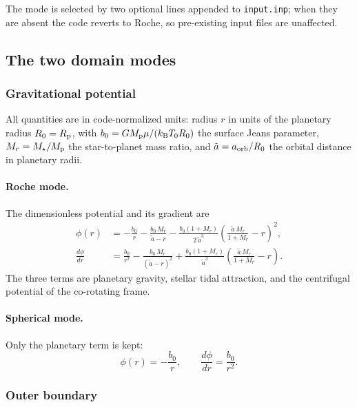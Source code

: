 \documentclass[english,a4paper]{kiseon_memo}
\begin{document}
The mode is selected by two optional lines appended to \texttt{input.inp}; when
they are absent the code reverts to Roche, so pre-existing input files are
unaffected.

\subsection{The two domain modes}

\subsubsection{Gravitational potential}

All quantities are in code-normalized units: radius $r$ in units of the
planetary radius $R_0=R_{\rm p}$, with $b_0=G M_{\rm p}\mu/(k_{\rm B}T_0R_0)$
the surface Jeans parameter, $M_r=M_\star/M_{\rm p}$ the star-to-planet mass
ratio, and $\tilde a = a_{\rm orb}/R_0$ the orbital distance in planetary radii.

\paragraph{Roche mode.} The dimensionless potential and its gradient are
\begin{align}
\phi(r) &= -\frac{b_0}{r}
          - \frac{b_0\,M_r}{\tilde a - r}
          - \frac{b_0(1+M_r)}{2\,\tilde a^3}
            \left(\frac{\tilde a\,M_r}{1+M_r} - r\right)^{\!2}, \\
\frac{d\phi}{dr} &= \frac{b_0}{r^2}
          - \frac{b_0\,M_r}{(\tilde a - r)^2}
          + \frac{b_0(1+M_r)}{\tilde a^3}
            \left(\frac{\tilde a\,M_r}{1+M_r} - r\right).
\end{align}
The three terms are planetary gravity, stellar tidal attraction, and the
centrifugal potential of the co-rotating frame.

\paragraph{Spherical mode.} Only the planetary term is kept:
\begin{equation}
\phi(r) = -\frac{b_0}{r}, \qquad \frac{d\phi}{dr} = \frac{b_0}{r^2}.
\end{equation}

\subsubsection{Outer boundary}
\end{document}
